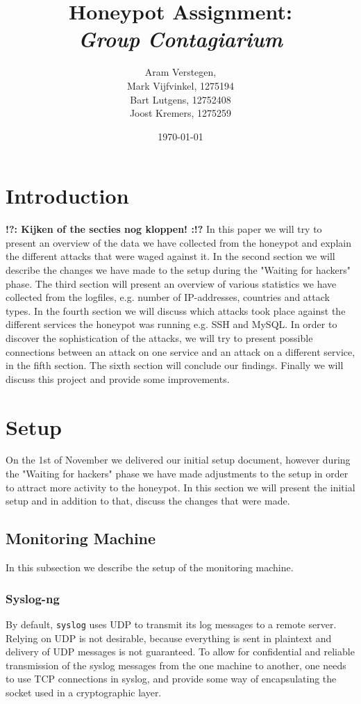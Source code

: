 \documentclass[11pt]{article}
\title{\textbf{Honeypot Assignment: \\ \emph{Group Contagiarium}}}
\author{Aram Verstegen, \tocheck{studentnummer Utwente} \\
	 Mark Vijfvinkel, 1275194 \\
	 Bart Lutgens, 12752408 \\
	Joost Kremers, 1275259}
\date{\today}
\newcommand{\tocheck}[1]{{\bf !?: #1 :!?}}
\begin{document}
\maketitle


\section{Introduction}
\tocheck{Kijken of the secties nog kloppen!}
In this paper we will try to present an overview of the data we have collected from the honeypot and explain the different attacks that were waged against it. 
In the second section we will describe the changes we have made to the setup during the "Waiting for hackers" phase. 
The third section will present an overview of various statistics we have collected from the logfiles, e.g. number of IP-addresses, countries and attack types. 
In the fourth section we will discuss which attacks took place against the different services the honeypot was running e.g. SSH and MySQL.
In order to discover the sophistication of the attacks, we will try to present possible connections between an attack on one service and an attack on a different service, in the fifth section.
The sixth section will conclude our findings. 
Finally we will discuss this project and provide some improvements. 


\section{Setup}
\label{Setup}

On the 1st of November we delivered our initial setup document, however during the "Waiting for hackers" phase we have made adjustments to the setup in order to attract more activity to the honeypot. In this section we will present the initial setup and in addition to that, discuss the changes that were made.


\subsection{Monitoring Machine}

In this subsection we describe the setup of the monitoring machine.

\subsubsection{Syslog-ng}
By default, \verb|syslog| uses UDP to transmit its log messages to a remote server.
Relying on UDP is not desirable, because everything is sent in plaintext and delivery of UDP messages is not guaranteed.
To allow for confidential and reliable transmission of the syslog messages from the one machine to another, one needs to use TCP connections in syslog, and provide some way of encapsulating the socket used in a cryptographic layer.
\end{document}
